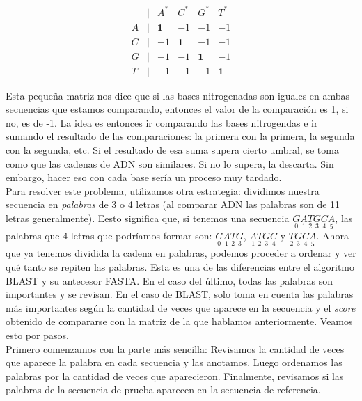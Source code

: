 \documentclass[10pt,letterpaper]{article}
\begin{document}
\begin{equation*}
\begin{matrix}
 & \vert & A^{*} & C^{*} & G^{*} & T^{*}\\
\hline
A & \vert & \textbf{1} & -1 & -1 & -1\\
C & \vert & -1 & \textbf{1} & -1 & -1\\
G & \vert & -1 & -1 & \textbf{1} & -1\\
T & \vert & -1 & -1 & -1 & \textbf{1}
\end{matrix}
\end{equation*}

Esta peque\~na matriz nos dice que si las bases nitrogenadas son iguales en ambas secuencias que estamos comparando, entonces el valor de la comparaci\'on es 1, si no, es de -1. La idea es entonces ir comparando las bases nitrogendas e ir sumando el resultado de las comparaciones: la primera con la primera, la segunda con la segunda, etc. Si el resultado de esa suma supera cierto umbral, se toma como que las cadenas de ADN son similares. Si no lo supera, la descarta. Sin embargo, hacer eso con cada base ser\'ia un proceso muy tardado.\\

Para resolver este problema, utilizamos otra estrategia: dividimos nuestra secuencia en \emph{palabras} de 3 o 4 letras (al comparar ADN las palabras son de 11 letras generalmente). Eesto significa que, si tenemos una secuencia $\underset{0}{G} \underset{1}{A} \underset{2}{T} \underset{3}{G} \underset{4}{C} \underset{5}{A}$, las palabras que 4 letras que podr\'iamos formar son: $\underset{0}{G} \underset{1}{A} \underset{2}{T} \underset{3}{G}$, $\underset{1}{A} \underset{2}{T} \underset{3}{G} \underset{4}{C}$ y $\underset{2}{T} \underset{3}{G} \underset{4}{C} \underset{5}{A}$. Ahora que ya tenemos dividida la cadena en palabras, podemos proceder a ordenar y ver qu\'e tanto se repiten las palabras. Esta es una de las diferencias entre el algoritmo BLAST y su antecesor FASTA. En el caso del \'ultimo, todas las palabras son importantes y se revisan. En el caso de BLAST, solo toma en cuenta las palabras m\'as importantes seg\'un la cantidad de veces que aparece en la secuencia y el \emph{score} obtenido de compararse con la matriz de la que hablamos anteriormente. Veamos esto por pasos.\\

Primero comenzamos con la parte m\'as sencilla: Revisamos la cantidad de veces que aparece la palabra en cada secuencia y las anotamos. Luego ordenamos las palabras por la cantidad de veces que aparecieron. Finalmente, revisamos si las palabras de la secuencia de prueba aparecen en la secuencia de referencia.\\
\end{document}
